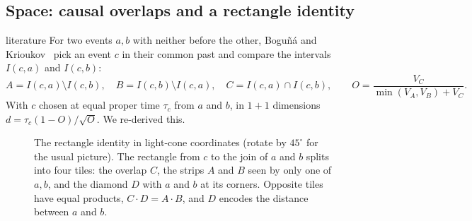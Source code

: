 \documentclass[11pt,a4paper]{article}
\newcommand{\tagbox}[2]{\textsf{\scriptsize\colorbox{#1!12}{\textcolor{#1!70!black}{#2}}}}
\newcommand{\lit}{\tagbox{blue}{literature}}
\begin{document}
\subsection{Space: causal overlaps and a rectangle identity}
\lit{} For two events $a,b$ with neither before the other, Boguñá and Krioukov~\cite{BK24} pick an event $c$ in their common past and compare the intervals $I(c,a)$ and $I(c,b)$:
\begin{equation}
A=I(c,a)\setminus I(c,b),\quad B=I(c,b)\setminus I(c,a),\quad C=I(c,a)\cap I(c,b),\qquad O=\frac{V_C}{\min(V_A,V_B)+V_C}.
\end{equation}
With $c$ chosen at equal proper time $\tau_c$ from $a$ and $b$, in $1+1$ dimensions $d=\tau_c(1-O)/\sqrt O$. We re-derived this.

\begin{figure}[t]
\centering
{}
\caption{The rectangle identity in light-cone coordinates (rotate by $45^\circ$ for the usual picture). The rectangle from $c$ to the join of $a$ and $b$ splits into four tiles: the overlap $C$, the strips $A$ and $B$ seen by only one of $a,b$, and the diamond $D$ with $a$ and $b$ at its corners. Opposite tiles have equal products, $C\cdot D=A\cdot B$, and $D$ encodes the distance between $a$ and $b$.}
\label{fig:tiles}
\end{figure}
\end{document}
